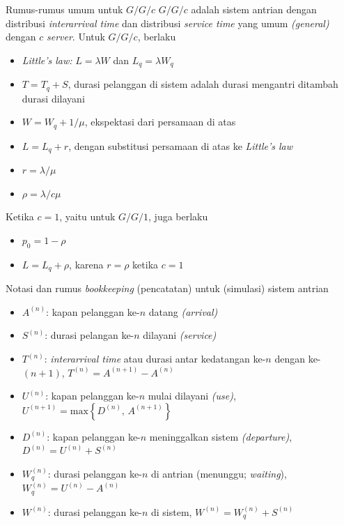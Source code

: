 \documentclass{beamer}
\newcommand{\braces}[1]{\left\{#1\right\}}
\begin{document}
\begin{frame}{Rumus-rumus umum untuk \(G/G/c\)}
    \(G/G/c\) adalah sistem antrian dengan distribusi \textit{interarrival time} dan distribusi \textit{service time} yang umum \textit{(general)} dengan \(c\) \textit{server}. Untuk \(G/G/c\), berlaku
    \begin{itemize}
        \item \textit{Little's law:} \(L=\lambda W\) dan \(L_q = \lambda W_q\)
        \item \(T = T_q + S\), durasi pelanggan di sistem adalah durasi mengantri ditambah durasi dilayani
        \item \(W = W_q + 1/\mu\), ekspektasi dari persamaan di atas
        \item \(L = L_q + r\),
        dengan substitusi persamaan di atas ke \textit{Little's law}
        \item \(r = \lambda/\mu\)
        \item \(\rho = \lambda/c\mu\)
    \end{itemize}
    Ketika \(c=1\), yaitu untuk \(G/G/1\), juga berlaku
    \begin{itemize}
        \item \(p_0 = 1 - \rho\)
        \item \(L = L_q + \rho\), karena \(r = \rho\) ketika \(c=1\)
    \end{itemize}
\end{frame}

\begin{frame}{Notasi dan rumus \textit{bookkeeping} (pencatatan) untuk (simulasi) sistem antrian}
    \begin{itemize}
        \item \(A^{(n)}\): kapan pelanggan ke-\(n\) datang \textit{(arrival)}
        \item \(S^{(n)}\): durasi pelangan ke-\(n\) dilayani \textit{(service)}
        \item \(T^{(n)}\): \textit{interarrival time} atau durasi antar kedatangan ke-\(n\) dengan ke-\((n+1)\), 
        \(T^{(n)} = A^{(n+1)} - A^{(n)}\)
        \item \(U^{(n)}\): kapan pelanggan ke-\(n\) mulai dilayani \textit{(use)}, 
        \(U^{(n+1)} = \text{max}\braces{D^{(n)}, \, A^{(n+1)}}\)
        \item \(D^{(n)}\): kapan pelanggan ke-\(n\) meninggalkan sistem \textit{(departure)}, 
        \(D^{(n)} = U^{(n)} + S^{(n)}\)
        \item \(W_q^{(n)}\): durasi pelanggan ke-\(n\) di antrian (menunggu; \textit{waiting}), 
        \(W_q^{(n)} = U^{(n)} - A^{(n)}\)
        \item \(W^{(n)}\): durasi pelanggan ke-\(n\) di sistem, 
        \(W^{(n)} = W_q^{(n)} + S^{(n)}\)
    \end{itemize}
\end{frame}
\end{document}
